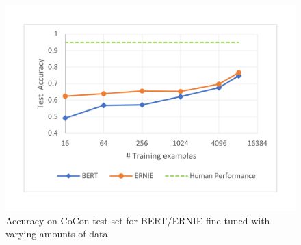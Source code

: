 \begin{figure}[h!]
	\centering
	\includegraphics[width=0.85\columnwidth]{images/learnCurveLine.pdf}
	\caption{Accuracy on CoCon test set for BERT/ERNIE fine-tuned with varying amounts of data}
	\label{fig:learnCurve}
\end{figure}

